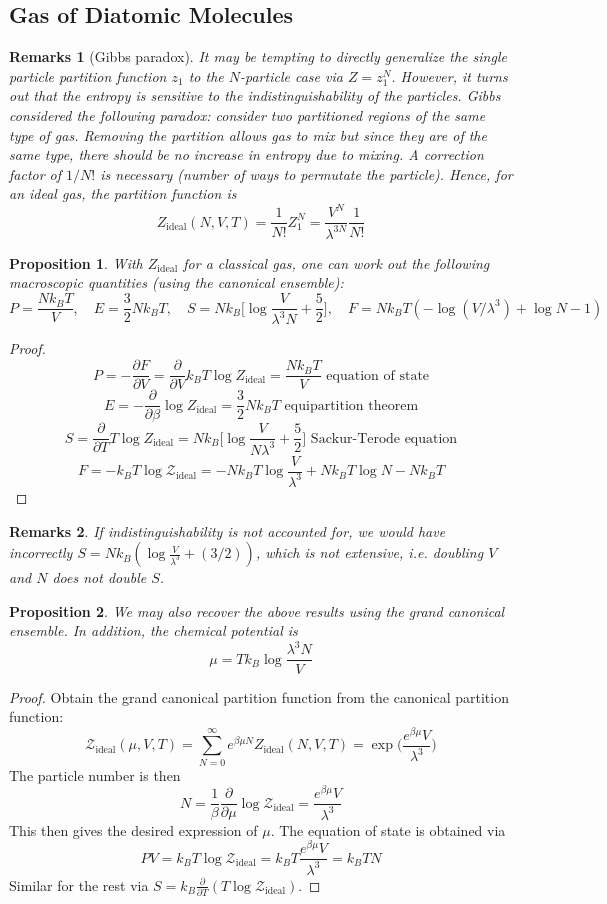 \documentclass[a4paper]{article}
\newtheorem{remarks}{Remarks}[section]
\theoremstyle{new}
\newtheorem{prop}{Proposition}[section]
\begin{document}
\subsection{Gas of Diatomic Molecules}
\begin{remarks}[Gibbs paradox]
It may be tempting to directly generalize the single particle partition function $z_1$ to the $N$-particle case via $Z=z_1^N$. However, it turns out that the entropy is sensitive to the indistinguishability of the particles. Gibbs considered the following paradox: consider two partitioned regions of the same type of gas. Removing the partition allows gas to mix but since they are of the same type, there should be no increase in entropy due to mixing. A correction factor of $1/N!$ is necessary (number of ways to permutate the particle). Hence, for an ideal gas, the partition function is
$$Z_{\text{ideal}}(N,V,T)=\frac{1}{N!}Z_1^N=\frac{V^N}{\lambda^{3N}}\frac{1}{N!}$$
\end{remarks}
\begin{prop}
With $Z_{\text{ideal}}$ for a classical gas, one can work out the following macroscopic quantities (using the canonical ensemble):
$$P=\frac{Nk_BT}{V},\quad E=\frac{3}{2}Nk_BT,\quad S=Nk_B\bigg[\log\frac{V}{\lambda^3N}+\frac{5}{2}\bigg],\quad F=Nk_BT(-\log(V/\lambda^3)+\log N-1)$$
\end{prop}
\begin{proof}
$$P=-\frac{\partial F}{\partial V}=\frac{\partial}{\partial V}k_BT\log Z_{\text{ideal}}=\frac{Nk_BT}{V}\text{ equation of state}$$
$$E=-\frac{\partial}{\partial\beta}\log Z_{\text{ideal}}=\frac{3}{2}Nk_BT\text{ equipartition theorem}$$
$$S=\frac{\partial}{\partial T}T\log Z_{\text{ideal}}=Nk_B\bigg[\log\frac{V}{N\lambda^3}+\frac{5}{2}\bigg]\text{ Sackur-Terode equation}$$
$$F=-k_BT\log\mathcal{Z}_{\text{ideal}}=-Nk_BT\log\frac{V}{\lambda^3}+Nk_BT\log N-Nk_BT$$
\end{proof}
\begin{remarks}
If indistinguishability is not accounted for, we would have incorrectly $S=Nk_B(\log\frac{V}{\lambda^3}+(3/2))$, which is not extensive, i.e. doubling $V$ and $N$ does not double $S$.
\end{remarks}
\begin{prop}
We may also recover the above results using the grand canonical ensemble. In addition, the chemical potential is
$$\mu=Tk_B\log\frac{\lambda^3N}{V}$$
\end{prop}
\begin{proof}
Obtain the grand canonical partition function from the canonical partition function:
$$\mathcal{Z}_{\text{ideal}}(\mu,V,T)=\sum_{N=0}^\infty e^{\beta\mu N}Z_{\text{ideal}}(N,V,T)=\exp\bigg(\frac{e^{\beta\mu }V}{\lambda^3}\bigg)$$
The particle number is then
$$N=\frac{1}{\beta}\frac{\partial}{\partial\mu}\log\mathcal{Z}_{\text{ideal}}=\frac{e^{\beta\mu }V}{\lambda^3}$$
This then gives the desired expression of $\mu$. The equation of state is obtained via
$$PV=k_BT\log\mathcal{Z}_{\text{ideal}}=k_BT\frac{e^{\beta\mu}V}{\lambda^3}=k_BTN$$
Similar for the rest via $S=k_B\frac{\partial}{\partial T}(T\log\mathcal{Z}_{\text{ideal}})$.
\end{proof}
\end{document}
